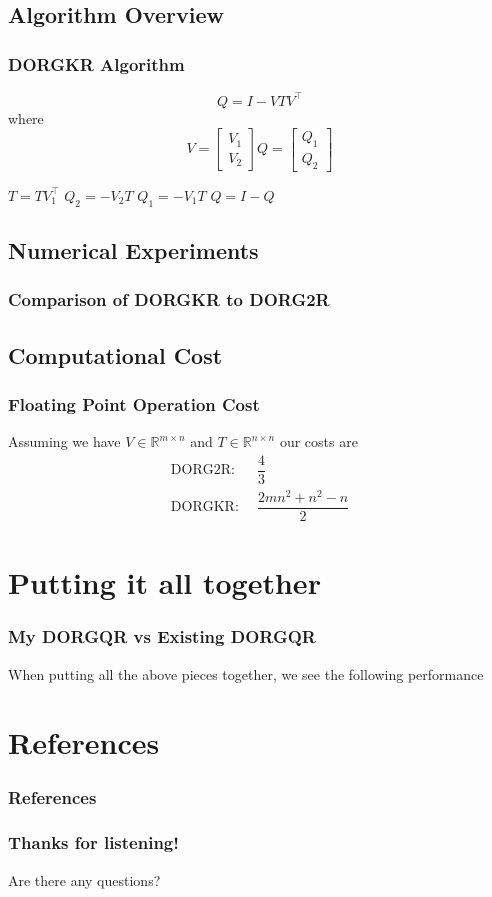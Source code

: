 \documentclass[12pt]{beamer}
\newcommand{\R}{\mathbb{R}}
\begin{document}
    \subsection{Algorithm Overview}
    \begin{frame}
        \frametitle{DORGKR Algorithm}
        $$
            Q = I - VTV^\top
        $$ where
        $$
        V = \begin{bmatrix} V_1 \\ V_2 \end{bmatrix}
        Q = \begin{bmatrix} Q_1 \\ Q_2 \end{bmatrix}
        $$
        \begin{algorithmic}[1]
            \State $T = TV_1^\top$
            \State $Q_2 = -V_2T$
            \State $Q_1 = -V_1T$
            \State $Q = I - Q$
        \end{algorithmic}
    \end{frame}
    \subsection{Numerical Experiments}
    \begin{frame}
        \frametitle{Comparison of DORGKR to DORG2R}
    \end{frame}
    \subsection{Computational Cost}
    \begin{frame}
        \frametitle{Floating Point Operation Cost}
        Assuming we have $V\in\R^{m\times n}$ and $T\in\R^{n\times n}$ our costs are 
        \begin{align*}
            \text{DORG2R: }&\, \dfrac{4}{3}\\
            \text{DORGKR: }&\, \dfrac{2mn^2 + n^2 - n}{2}
        \end{align*}
    \end{frame}
    \section{Putting it all together}
    \begin{frame}
        \frametitle{My DORGQR vs Existing DORGQR} 
        When putting all the above pieces together, we see the following performance
    \end{frame}
    \section{References}
    \begin{frame}
        \frametitle{References}
    \end{frame}
    \begin{frame}
        \frametitle{Thanks for listening!}
        Are there any questions?
    \end{frame}
\end{document}
